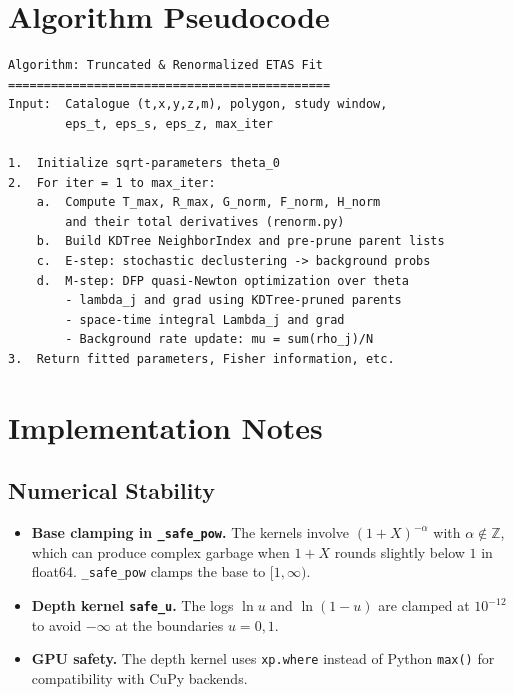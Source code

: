 \documentclass[11pt,a4paper]{article}
\theoremstyle{plain}
\theoremstyle{definition}
\begin{document}
\section{Algorithm Pseudocode}\label{sec:pseudo}

\begin{lstlisting}[caption={Truncated \& Renormalized ETAS fit.}]
Algorithm: Truncated & Renormalized ETAS Fit
=============================================
Input:  Catalogue (t,x,y,z,m), polygon, study window,
        eps_t, eps_s, eps_z, max_iter

1.  Initialize sqrt-parameters theta_0
2.  For iter = 1 to max_iter:
    a.  Compute T_max, R_max, G_norm, F_norm, H_norm
        and their total derivatives (renorm.py)
    b.  Build KDTree NeighborIndex and pre-prune parent lists
    c.  E-step: stochastic declustering -> background probs
    d.  M-step: DFP quasi-Newton optimization over theta
        - lambda_j and grad using KDTree-pruned parents
        - space-time integral Lambda_j and grad
        - Background rate update: mu = sum(rho_j)/N
3.  Return fitted parameters, Fisher information, etc.
\end{lstlisting}

\section{Implementation Notes}\label{sec:impl}

\subsection{Numerical Stability}

\begin{itemize}
\item \textbf{Base clamping in \texttt{\_safe\_pow}.} The kernels involve
      $(1+X)^{-\alpha}$ with $\alpha\notin\mathbb{Z}$, which can produce
      complex garbage when $1+X$ rounds slightly below $1$ in float64.
      \texttt{\_safe\_pow} clamps the base to $[1,\infty)$.
\item \textbf{Depth kernel \texttt{safe\_u}.} The logs $\ln u$ and $\ln(1-u)$
      are clamped at $10^{-12}$ to avoid $-\infty$ at the boundaries $u=0,1$.
\item \textbf{GPU safety.} The depth kernel uses \texttt{xp.where} instead of
      Python \texttt{max()} for compatibility with CuPy backends.
\end{itemize}
\end{document}
